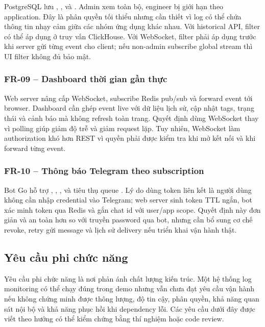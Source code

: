 PostgreSQL lưu , ,  và . Admin xem toàn bộ, engineer bị giới hạn theo application. Đây là phân quyền tối thiểu nhưng cần thiết vì log có thể chứa thông tin nhạy cảm giữa các nhóm ứng dụng khác nhau. Với historical API, filter có thể áp dụng ở truy vấn ClickHouse. Với WebSocket, filter phải áp dụng trước khi server gửi từng event cho client; nếu non-admin subscribe global stream thì UI filter không đủ bảo mật.

\subsubsection{FR-09 -- Dashboard thời gian gần thực}

Web server nâng cấp WebSocket, subscribe Redis pub/sub và forward event tới browser. Dashboard cần ghép event live với dữ liệu lịch sử, cập nhật tags, trạng thái và cảnh báo mà không refresh toàn trang. Quyết định dùng WebSocket thay vì polling giúp giảm độ trễ và giảm request lặp. Tuy nhiên, WebSocket làm authorization khó hơn REST vì quyền phải được kiểm tra khi mở kết nối và khi forward từng event.

\subsubsection{FR-10 -- Thông báo Telegram theo subscription}

Bot Go hỗ trợ , , ,  và tiêu thụ queue . Lý do dùng token liên kết là người dùng không cần nhập credential vào Telegram; web server sinh token TTL ngắn, bot xác minh token qua Redis và gắn chat id với user/app scope. Quyết định này đơn giản và an toàn hơn so với truyền password qua bot, nhưng cần bổ sung cơ chế revoke, retry gửi message và lịch sử delivery nếu triển khai vận hành thật.

\subsection{Yêu cầu phi chức năng}

Yêu cầu phi chức năng là nơi phản ánh chất lượng kiến trúc. Một hệ thống log monitoring có thể chạy đúng trong demo nhưng vẫn chưa đạt yêu cầu vận hành nếu không chứng minh được thông lượng, độ tin cậy, phân quyền, khả năng quan sát nội bộ và khả năng phục hồi khi dependency lỗi. Các yêu cầu dưới đây được viết theo hướng có thể kiểm chứng bằng thí nghiệm hoặc code review.

